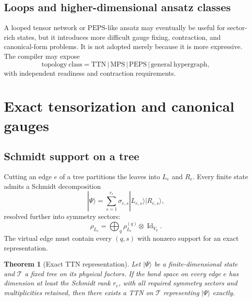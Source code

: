 \documentclass[11pt]{article}
\newtheorem{theorem}[definition]{Theorem}
\newcommand{\Id}{\operatorname{Id}}
\newcommand{\TTN}{\ensuremath{\mathrm{TTN}}}
\newcommand{\MPS}{\ensuremath{\mathrm{MPS}}}
\newcommand{\PEPS}{\ensuremath{\mathrm{PEPS}}}
\newcommand{\cT}{\mathcal T}
\begin{document}
\subsection{Loops and higher-dimensional ansatz classes}

A looped tensor network or \PEPS-like ansatz may eventually be useful for
sector-rich states, but it introduces more difficult gauge fixing,
contraction, and canonical-form problems.  It is not adopted merely because it
is more expressive.  The compiler may expose
\begin{equation}
 \mathrm{topology\ class}
 =\TTN\,|\,\MPS\,|\,\PEPS\,|\,\mathrm{general\ hypergraph},
\label{eq:topology-class}
\end{equation}
with independent readiness and contraction requirements.

\section{Exact tensorization and canonical gauges}
\label{sec:exact-tensorization}

\subsection{Schmidt support on a tree}

Cutting an edge \(e\) of a tree partitions the leaves into \(L_e\) and \(R_e\).
Every finite state admits a Schmidt decomposition
\begin{equation}
 |\Psi\rangle
 =
 \sum_{s=1}^{r_e}
 \sigma_{e,s}
 |L_{e,s}\rangle|R_{e,s}\rangle,
\label{eq:schmidt-edge}
\end{equation}
resolved further into symmetry sectors:
\begin{equation}
 \rho_{L_e}
 =
 \bigoplus_q
 \rho_{L_e}^{(q)}\otimes\Id_{V_q}.
\label{eq:symmetry-schmidt}
\end{equation}
The virtual edge must contain every \((q,s)\) with nonzero support for an exact
representation.

\begin{theorem}[Exact TTN representation]
Let \(|\Psi\rangle\) be a finite-dimensional state and \(\cT\) a fixed tree on
its physical factors.  If the bond space on every edge \(e\) has dimension at
least the Schmidt rank \(r_e\), with all required symmetry sectors and
multiplicities retained, then there exists a TTN on \(\cT\) representing
\(|\Psi\rangle\) exactly.
\end{theorem}
\end{document}
